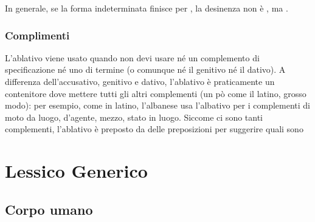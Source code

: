 In generale, se la forma indeterminata finisce per , la desinenza non è , ma .

\subsection{Complimenti}

L'ablativo viene usato quando non devi usare né un complemento di specificazione né uno di termine (o comunque né il genitivo né il dativo)\cite{vocedellaquila:ablativo}.
A differenza dell'accusativo, genitivo e dativo, l'ablativo è praticamente un contenitore dove mettere tutti gli altri complementi (un pò come il latino, grosso modo): per esempio, come in latino, l'albanese usa l'albativo per i complementi di moto da luogo, d'agente, mezzo, stato in luogo.
Siccome ci sono tanti complementi, l'ablativo è preposto da delle preposizioni per suggerire quali sono   

\chapter{Lessico Generico}

\section{Corpo umano}

